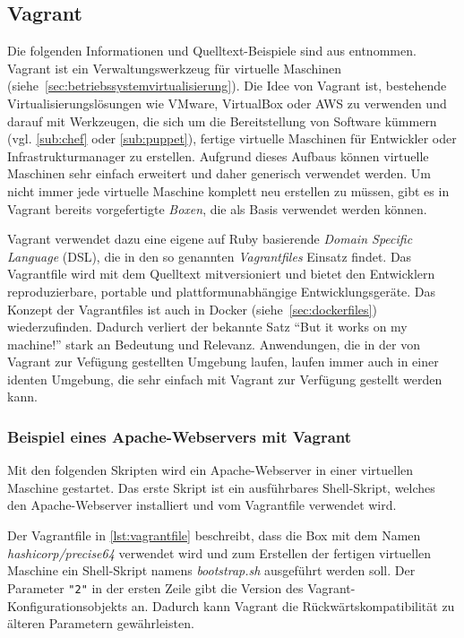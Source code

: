 \subsection{Vagrant}
\label{sub:vagrant}
Die folgenden Informationen und Quelltext-Beispiele sind aus \autocite{Vagrant:online} entnommen.
Vagrant ist ein Verwaltungswerkzeug für virtuelle Maschinen (siehe~\cref{sec:betriebssystemvirtualisierung}).
Die Idee von Vagrant ist, bestehende Virtualisierungslösungen wie VMware, VirtualBox oder AWS zu verwenden und darauf mit Werkzeugen, die sich um die Bereitstellung von Software kümmern (vgl. \cref{sub:chef} oder \cref{sub:puppet}), fertige virtuelle Maschinen für Entwickler oder Infrastrukturmanager zu erstellen.
Aufgrund dieses Aufbaus können virtuelle Maschinen sehr einfach erweitert und daher generisch verwendet werden.
Um nicht immer jede virtuelle Maschine komplett neu erstellen zu müssen, gibt es in Vagrant bereits vorgefertigte \emph{Boxen}, die als Basis verwendet werden können.

Vagrant verwendet dazu eine eigene auf Ruby basierende \emph{Domain Specific Language} (DSL), die in den so genannten \emph{Vagrantfiles} Einsatz findet.
Das Vagrantfile wird mit dem Quelltext mitversioniert und bietet den Entwicklern reproduzierbare, portable und plattformunabhängige Entwicklungsgeräte.
Das Konzept der Vagrantfiles ist auch in Docker (siehe~\cref{sec:dockerfiles}) wiederzufinden.
Dadurch verliert der bekannte Satz ``But it works on my machine!'' stark an Bedeutung und Relevanz.
Anwendungen, die in der von Vagrant zur Vefügung gestellten Umgebung laufen, laufen immer auch in einer identen Umgebung, die sehr einfach mit Vagrant zur Verfügung gestellt werden kann.

\subsubsection{Beispiel eines Apache-Webservers mit Vagrant}
Mit den folgenden Skripten wird ein Apache-Webserver in einer virtuellen Maschine gestartet.
Das erste Skript ist ein ausführbares Shell-Skript, welches den Apache-Webserver installiert und vom Vagrantfile verwendet wird.

\label{lst:vagrant-bootstrap}
Der Vagrantfile in \cref{lst:vagrantfile} beschreibt, dass die Box mit dem Namen \emph{hashicorp/precise64} verwendet wird und zum Erstellen der fertigen virtuellen Maschine ein Shell-Skript namens \emph{bootstrap.sh} ausgeführt werden soll.
Der Parameter \lstinline{"2"} in der ersten Zeile gibt die Version des Vagrant-Konfigurationsobjekts an.
Dadurch kann Vagrant die Rückwärtskompatibilität zu älteren Parametern gewährleisten.


